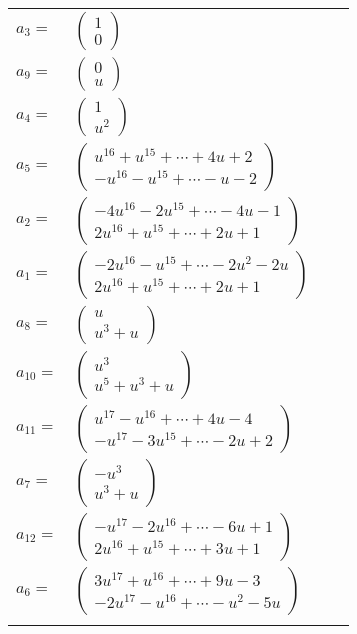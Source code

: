 \documentclass[1p]{elsarticle_modified}
\theoremstyle{definition}
\begin{document}
\begin{tabular}{m{7pt} m{180pt} m{7pt} m{180pt} }
\flushright $a_{3}=$&$\begin{pmatrix}1\\0\end{pmatrix}$ \\
\flushright $a_{9}=$&$\begin{pmatrix}0\\u\end{pmatrix}$ \\
\flushright $a_{4}=$&$\begin{pmatrix}1\\u^2\end{pmatrix}$ \\
\flushright $a_{5}=$&$\begin{pmatrix}u^{16}+u^{15}+\cdots+4 u+2\\- u^{16}- u^{15}+\cdots- u-2\end{pmatrix}$ \\
\flushright $a_{2}=$&$\begin{pmatrix}-4 u^{16}-2 u^{15}+\cdots-4 u-1\\2 u^{16}+u^{15}+\cdots+2 u+1\end{pmatrix}$ \\
\flushright $a_{1}=$&$\begin{pmatrix}-2 u^{16}- u^{15}+\cdots-2 u^2-2 u\\2 u^{16}+u^{15}+\cdots+2 u+1\end{pmatrix}$ \\
\flushright $a_{8}=$&$\begin{pmatrix}u\\u^3+u\end{pmatrix}$ \\
\flushright $a_{10}=$&$\begin{pmatrix}u^3\\u^5+u^3+u\end{pmatrix}$ \\
\flushright $a_{11}=$&$\begin{pmatrix}u^{17}- u^{16}+\cdots+4 u-4\\- u^{17}-3 u^{15}+\cdots-2 u+2\end{pmatrix}$ \\
\flushright $a_{7}=$&$\begin{pmatrix}- u^3\\u^3+u\end{pmatrix}$ \\
\flushright $a_{12}=$&$\begin{pmatrix}- u^{17}-2 u^{16}+\cdots-6 u+1\\2 u^{16}+u^{15}+\cdots+3 u+1\end{pmatrix}$ \\
\flushright $a_{6}=$&$\begin{pmatrix}3 u^{17}+u^{16}+\cdots+9 u-3\\-2 u^{17}- u^{16}+\cdots- u^2-5 u\end{pmatrix}$\\&\end{tabular}
\end{document}
